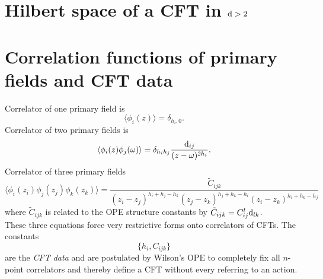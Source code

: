  	
 	
 	
 	
 	
 	
 	
 	
 	
 	
 	
 	
 	
 	
 	
 	
 	
 	\section{Hilbert space of a CFT in $\mathrm{d}>2$}
 	
 	

 	
 	
 	\section{Correlation functions of primary fields and CFT data}
 	\begin{mybox}{}
 		Correlator of one primary field is
 		\begin{equation}
 		\langle \phi_i(z) \rangle = \delta_{h_i,0}.
 		\end{equation}
 		Correlator of two primary fields is
 		\begin{equation}
 		\langle \phi_i(z) \phi_j(\omega)\rangle = \delta_{h_i h_j} \frac{\mathrm{d}_{ij}}{(z-\omega)^{2h_i}}.
 		\end{equation}
 		Correlator of three primary fields
 		\begin{equation}
 		\langle \phi_i(z_i)\phi_j(z_j) \phi_k(z_k)\rangle = \frac{\tilde{C}_{ijk}}{(z_i-z_j)^{h_i+h_j-h_k} (z_j-z_k)^{h_j+h_k-h_i} (z_i-z_k)^{h_i+h_k-h_j} }
 		\end{equation}
 		where $\tilde{C}_{ijk}$ is related to the OPE structure constants by $\tilde{C}_{ijk} = C^l_{ij} \mathrm{d}_{lk}$.\\
 		These three equations force very restrictive forms onto correlators of CFTs. The constants
 		\begin{equation}
 		\{h_i,C_{ijk} \}
 		\end{equation}
 		are the \emph{CFT data} and are postulated by Wilson's OPE to completely fix all $n$-point correlators and thereby define a CFT without every referring to an action.
 	\end{mybox}
 	
 	
 	
 	

 	
 	
 	
 	
 	
